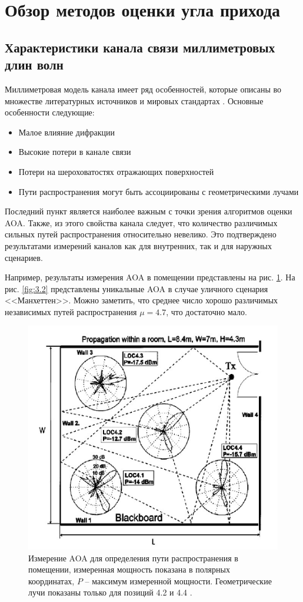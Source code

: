 \section{Обзор методов оценки угла прихода}
\label{sec:review}

\subsection{Характеристики канала связи миллиметровых длин волн}
Миллиметровая модель канала имеет ряд особенностей, которые описаны во множестве
литературных источников и мировых стандартах \cite{Maltsev2010, Maltsev2017,
    Xu2002, Akdeniz2014, Rappaport2015}. Основные особенности следующие:
\begin{itemize}
    \item Малое влияние дифракции
    \item Высокие потери в канале связи
    \item Потери на шероховатостях отражающих поверхностей
    \item Пути распространения могут быть ассоциированы с геометрическими лучами
\end{itemize}

Последний пункт является наиболее важным с точки зрения алгоритмов оценки AOA.
Также, из этого свойства канала следует, что количество различимых сильных путей
распространения относительно невелико. Это подтверждено результатами
измерений каналов как для внутренних, так и для наружных сценариев.

Например, результаты измерения AOA в помещении представлены на рис.
\ref{fig:3.1}.  На рис. \ref{fig:3.2} представлены уникальные AOA в случае
уличного сценария <<Манхеттен>>. Можно заметить, что среднее число хорошо
различимых независимых путей распространения $\mu=4.7$, что достаточно
мало.



\begin{figure}[ht]
    \centering
    \includegraphics[width=0.6\linewidth]{figs/fig3.1}
    \caption{ Измерение AOA для определения пути распространения в помещении,
        измеренная мощность показана в полярных координатах, $P$ -- максимум
        измеренной мощности. Геометрические лучи показаны только для позиций
        4.2 и 4.4 \cite{Xu2002}.}
    \label{fig:3.1}
\end{figure}

